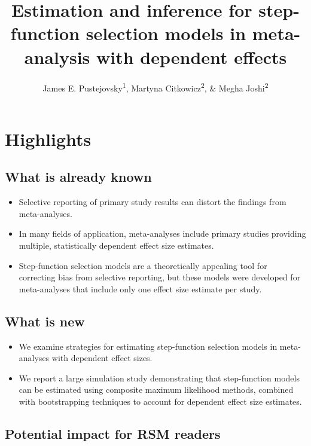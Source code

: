 \documentclass[
  man, donotrepeattitle,floatsintext]{apa7}
\title{Estimation and inference for step-function selection models in meta-analysis with dependent effects}
\author{James E. Pustejovsky\textsuperscript{1}, Martyna Citkowicz\textsuperscript{2}, \& Megha Joshi\textsuperscript{2}}
\date{}
\affiliation{\vspace{0.5cm}\textsuperscript{1} University of Wisconsin-Madison\\\textsuperscript{2} American Institutes for Research}
\begin{document}
\maketitle

\section*{Highlights}\label{highlights}

\subsection*{What is already known}\label{what-is-already-known}

\begin{itemize}
\item
  Selective reporting of primary study results can distort the findings from meta-analyses.
\item
  In many fields of application, meta-analyses include primary studies providing multiple, statistically dependent effect size estimates.
\item
  Step-function selection models are a theoretically appealing tool for correcting bias from selective reporting, but these models were developed for meta-analyses that include only one effect size estimate per study.
\end{itemize}

\subsection*{What is new}\label{what-is-new}

\begin{itemize}
\item
  We examine strategies for estimating step-function selection models in meta-analyses with dependent effect sizes.
\item
  We report a large simulation study demonstrating that step-function models can be estimated using composite maximum likelihood methods, combined with bootstrapping techniques to account for dependent effect size estimates.
\end{itemize}

\subsection*{Potential impact for RSM readers}\label{potential-impact-for-rsm-readers}
\end{document}
